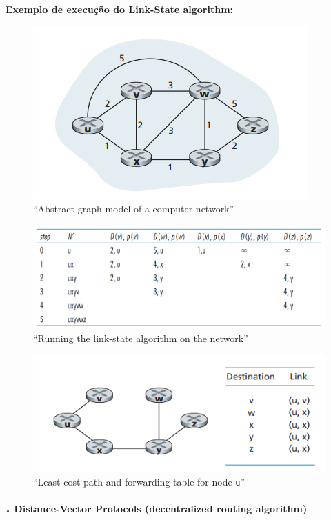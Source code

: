 \newpage
\noindent \textbf{Exemplo de execução do Link-State algorithm:}
\begin{figure}[H]
    \centering
    \includegraphics[width = 0.5\linewidth]{img/4/control-plane/state-link/graph-example.png}
    \caption{``Abstract graph model of a computer network''\cite{Kurose2017}}
    \label{fig:graph-example}
\end{figure}

\begin{figure}[H]
    \centering
    \includegraphics[width = 0.85\linewidth]{img/4/control-plane/state-link/dijkstra.png}
    \caption{``Running the link-state algorithm on the network''\cite{Kurose2017}}
    \label{fig:dijkstra}
\end{figure}

\begin{figure}[H]
    \centering
    \includegraphics[width = 0.7\linewidth]{img/4/control-plane/state-link/shortest-path.png}
    \caption{``Least cost path and forwarding table for node \texttt{u}''\cite{Kurose2017}}
    \label{fig:shortest-path}
\end{figure}

\clearpage
\paragraph[4.3.1.2 Distance-Vector Protocols]{$\pmb{\star}$ Distance-Vector Protocols (decentralized routing algorithm)}\mbox{}


